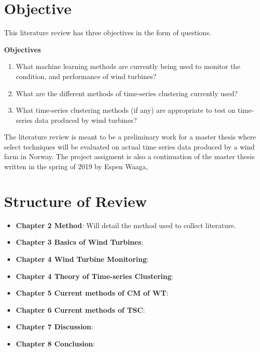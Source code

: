 \section{Objective} \label{sec:objective}
This literature review has three objectives in the form of questions. \bigskip

\begin{tcolorbox}
    \textbf{Objectives}

    \begin{enumerate}
        \item What machine learning methods are currently being used to monitor the condition, and performance of wind turbines?
        \item What are the different methods of time-series clustering currently used?
        \item What time-series clustering methods (if any) are appropriate to test on time-series data produced by wind turbines? 
    \end{enumerate}
\end{tcolorbox}
\bigskip

The literature review is meant to be a preliminary work for a master thesis where select techniques will be evaluated on actual time series data produced by a wind farm in Norway. The project assigment is also a continuation of the master thesis written in the spring of 2019 by Espen Waaga, 

\section{Structure of Review}
\begin{itemize}
    \item \textbf{Chapter 2 Method}: Will detail the method used to collect literature.
    \item \textbf{Chapter 3 Basics of Wind Turbines}:
    \item \textbf{Chapter 4 Wind Turbine Monitoring}:
    \item \textbf{Chapter 4 Theory of Time-series Clustering}:
    \item \textbf{Chapter 5 Current methods of CM of WT}: 
    \item \textbf{Chapter 6 Current methods of TSC}: 
    \item \textbf{Chapter 7 Discussion}:
    \item \textbf{Chapter 8 Conclusion}:
\end{itemize}
